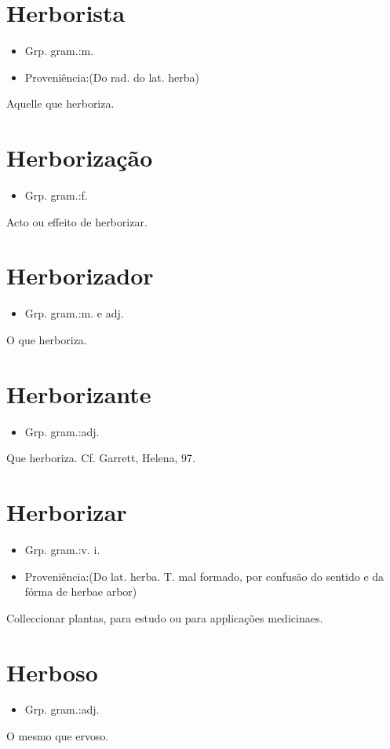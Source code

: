 \documentclass{article}
\begin{document}
\section{Herborista}
\begin{itemize}
\item {Grp. gram.:m.}
\end{itemize}
\begin{itemize}
\item {Proveniência:(Do rad. do lat. \textunderscore herba\textunderscore )}
\end{itemize}
Aquelle que herboriza.
\section{Herborização}
\begin{itemize}
\item {Grp. gram.:f.}
\end{itemize}
Acto ou effeito de herborizar.
\section{Herborizador}
\begin{itemize}
\item {Grp. gram.:m.  e  adj.}
\end{itemize}
O que herboriza.
\section{Herborizante}
\begin{itemize}
\item {Grp. gram.:adj.}
\end{itemize}
Que herboriza. Cf. Garrett, \textunderscore Helena\textunderscore , 97.
\section{Herborizar}
\begin{itemize}
\item {Grp. gram.:v. i.}
\end{itemize}
\begin{itemize}
\item {Proveniência:(Do lat. \textunderscore herba\textunderscore . T. mal formado, por confusão do sentido e da fórma de \textunderscore herba\textunderscore  e \textunderscore arbor\textunderscore )}
\end{itemize}
Colleccionar plantas, para estudo ou para applicações medicinaes.
\section{Herboso}
\begin{itemize}
\item {Grp. gram.:adj.}
\end{itemize}
O mesmo que \textunderscore ervoso\textunderscore .
\end{document}
